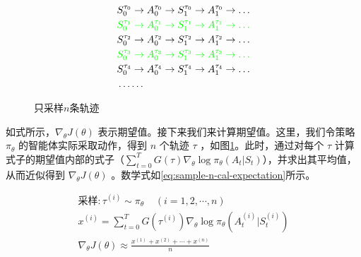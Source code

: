 \documentclass[lang=cn,newtx,10pt,scheme=chinese]{elegantbook}
\begin{document}

\begin{figure}[!ht]
\centering
\begin{equation*}
\begin{aligned}
& S_0^{\tau_0} \rightarrow A_0^{\tau_0} \rightarrow S_1^{\tau_0} \rightarrow A_1^{\tau_0} \rightarrow \dots \\
& {\color{green} S_0^{\tau_1} \rightarrow A_0^{\tau_1} \rightarrow S_1^{\tau_1} \rightarrow A_1^{\tau_1} \rightarrow \dots} \\
& S_0^{\tau_2} \rightarrow A_0^{\tau_2} \rightarrow S_1^{\tau_2} \rightarrow A_1^{\tau_2} \rightarrow \dots \\
& {\color{green} S_0^{\tau_3} \rightarrow A_0^{\tau_3} \rightarrow S_1^{\tau_3} \rightarrow A_1^{\tau_3} \rightarrow \dots} \\
& S_0^{\tau_4} \rightarrow A_0^{\tau_4} \rightarrow S_1^{\tau_4} \rightarrow A_1^{\tau_4} \rightarrow \dots \\
& \dots\dots
\end{aligned}
\end{equation*}
\caption{只采样$n$条轨迹}\label{fig:n-samples}
\end{figure}

如式所示，$\nabla_{\theta}J(\theta)$ 表示期望值。接下来我们来计算期望值。这里，我们令策略 $\pi_{\theta}$ 的智能体实际采取动作，得到 $n$ 个轨迹 $\tau$ ，如图\ref{fig:n-samples}。此时，通过对每个 $\tau$ 计算式子的期望值内部的式子（$\sum_{t=0}^TG(\tau)\nabla_{\theta}\log\pi_{\theta}(A_t|S_t)$），并求出其平均值，从而近似得到 $\nabla_{\theta}J(\theta)$ 。数学式如\ref{eq:sample-n-cal-expectation}所示。

\begin{equation}\label{eq:sample-n-cal-expectation}
\begin{aligned}
\text{采样}: \tau^{(i)}\sim\pi_{\theta}\;\;\;\;(i=1,2,\cdots,n) \\
x^{(i)} = \sum_{t=0}^TG(\tau^{(i)})\nabla_{\theta}\log\pi_{\theta}(A_t^{(i)}|S_t^{(i)}) \\
\nabla_{\theta}J(\theta) \approx \frac{x^{(1)}+x^{(2)}+\cdots+x^{(n)}}{n}
\end{aligned}
\end{equation}
\end{document}
